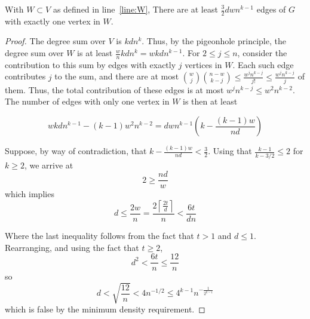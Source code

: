 \begin{lemma}\label{lm:many_edges}
    With $W  \subset V$ as defined in line~\ref{line:W},
    There are at least $\frac{3}{2}dwn^{k-1}$ edges of $G$ with exactly one vertex in $W$.
    \begin{proof}
        The degree sum over $V$ is $kdn^{k}$.
        Thus, by the pigeonhole principle, the degree sum over $W$ is at least
        $\frac{w}{n}kdn^{k} = wkdn^{k-1}$.
        For $2 \leq j \leq n$,
        consider the contribution to this sum by edges with exactly $j$ vertices in $W$.
        Each such edge contributes $j$ to the sum, and there are at most
        $\binom{w}{j}\binom{n-w}{k-j} \leq
        \frac{w^j n^{k-j}}{j!} \leq
        \frac{w^j n^{k-j}}{j}$ of them.
        Thus, the total contribution of these edges is at most $w^j n^{k-j} \leq w^{2}n^{k-2}$.
        The number of edges with only one vertex in $W$ is then at least

        \[
            wkdn^{k-1} - (k-1)w^{2}n^{k-2} = dwn^{k-1} \left( k - \frac{(k-1)w}{nd}\right)
        \]

        Suppose, by way of contradiction,
        that $ k - \frac{(k-1)w}{nd} < \frac{3}{2}$.
        Using that $\frac{k-1}{k-3/2} \leq 2$
        for $k \geq 2$, we arrive at
        \[
             2 \geq  \frac{nd}{w}
        \]
        which implies
        \[
            d \leq \frac{2w}{n} = \frac{2 \left\lceil\frac{2t}{d} \right\rceil}{n}
            < \frac{6t}{dn}
        \]

        Where the last inequality follows from the fact that $t > 1$ and $d \leq 1$.
        Rearranging, and using the fact that $t \geq 2$,
        \[
            d^2 < \frac{6t}{n} \leq \frac{12}{n}
        \]
        so
        \[
            d < \sqrt{\frac{12}{n}} < 4n^{-1/2} \leq 4^{k-1} n^{-\frac{1}{2^{k-1}}}
        \]
        which is false by the minimum density requirement.

    \end{proof}
\end{lemma}


